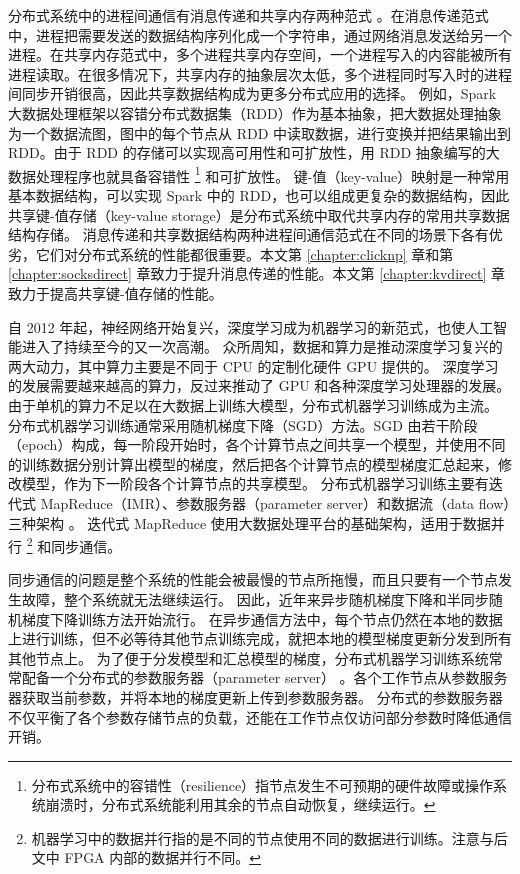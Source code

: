 分布式系统中的进程间通信有消息传递和共享内存两种范式 \cite{kshemkalyani2011distributed}。在消息传递范式中，进程把需要发送的数据结构序列化成一个字符串，通过网络消息发送给另一个进程。在共享内存范式中，多个进程共享内存空间，一个进程写入的内容能被所有进程读取。在很多情况下，共享内存的抽象层次太低，多个进程同时写入时的进程间同步开销很高，因此共享数据结构成为更多分布式应用的选择。
例如，Spark \cite{zaharia2010spark} 大数据处理框架以容错分布式数据集（RDD）作为基本抽象，把大数据处理抽象为一个数据流图，图中的每个节点从 RDD 中读取数据，进行变换并把结果输出到 RDD。由于 RDD 的存储可以实现高可用性和可扩放性，用 RDD 抽象编写的大数据处理程序也就具备容错性 \footnote{分布式系统中的容错性（resilience）指节点发生不可预期的硬件故障或操作系统崩溃时，分布式系统能利用其余的节点自动恢复，继续运行。} 和可扩放性。
键-值（key-value）映射是一种常用基本数据结构，可以实现 Spark 中的 RDD，也可以组成更复杂的数据结构，因此共享键-值存储（key-value storage）是分布式系统中取代共享内存的常用共享数据结构存储。
消息传递和共享数据结构两种进程间通信范式在不同的场景下各有优劣，它们对分布式系统的性能都很重要。本文第 \ref{chapter:clicknp} 章和第 \ref{chapter:socksdirect} 章致力于提升消息传递的性能。本文第 \ref{chapter:kvdirect} 章致力于提高共享键-值存储的性能。

自 2012 年起，神经网络开始复兴，深度学习成为机器学习的新范式，也使人工智能进入了持续至今的又一次高潮。
众所周知，数据和算力是推动深度学习复兴的两大动力，其中算力主要是不同于 CPU 的定制化硬件 GPU 提供的。
深度学习的发展需要越来越高的算力，反过来推动了 GPU 和各种深度学习处理器的发展。
由于单机的算力不足以在大数据上训练大模型，分布式机器学习训练成为主流。
分布式机器学习训练通常采用随机梯度下降（SGD）方法。SGD 由若干阶段（epoch）构成，每一阶段开始时，各个计算节点之间共享一个模型，并使用不同的训练数据分别计算出模型的梯度，然后把各个计算节点的模型梯度汇总起来，修改模型，作为下一阶段各个计算节点的共享模型。
分布式机器学习训练主要有迭代式 MapReduce（IMR）、参数服务器（parameter server）和数据流（data flow）三种架构 \cite{distributed-ml}。
迭代式 MapReduce 使用大数据处理平台的基础架构，适用于数据并行 \footnote{机器学习中的数据并行指的是不同的节点使用不同的数据进行训练。注意与后文中 FPGA 内部的数据并行不同。} 和同步通信。

同步通信的问题是整个系统的性能会被最慢的节点所拖慢，而且只要有一个节点发生故障，整个系统就无法继续运行。
因此，近年来异步随机梯度下降和半同步随机梯度下降训练方法开始流行。
在异步通信方法中，每个节点仍然在本地的数据上进行训练，但不必等待其他节点训练完成，就把本地的模型梯度更新分发到所有其他节点上。
为了便于分发模型和汇总模型的梯度，分布式机器学习训练系统常常配备一个分布式的参数服务器（parameter server） \cite{li2014scaling}。各个工作节点从参数服务器获取当前参数，并将本地的梯度更新上传到参数服务器。
分布式的参数服务器不仅平衡了各个参数存储节点的负载，还能在工作节点仅访问部分参数时降低通信开销。

